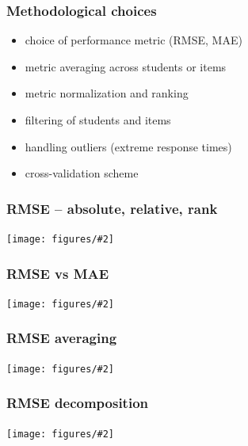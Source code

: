 \documentclass[bigger]{beamer}
\newcommand{\img}[2]{
  \begin{center}
    \texttt{[image: figures/\#2]}
  \end{center}
}
\begin{document}
\begin{frame}
  \frametitle{Methodological choices}
  \begin{itemize}
    \item choice of performance metric (RMSE, MAE)
    \item metric averaging across students or items
    \item metric normalization and ranking
    \item filtering of students and items
    \item handling outliers (extreme response times) %
    \item cross-validation scheme  %
  \end{itemize}


\end{frame}


\begin{frame}
  \frametitle{RMSE -- absolute, relative, rank}
  \img{1.0}{RMSE-abs-rel-rank}

\end{frame}


\begin{frame}
  \frametitle{RMSE vs MAE}
  \img{1.0}{RMSE-vs-MAE}

\end{frame}

\begin{frame}
  \frametitle{RMSE averaging}
  \img{1.0}{RMSE-averaging--Robot}

\end{frame}

\begin{frame}
  \frametitle{RMSE decomposition}
  \img{1.0}{RMSE-rank-per-level--Robot}

\end{frame}
\end{document}

